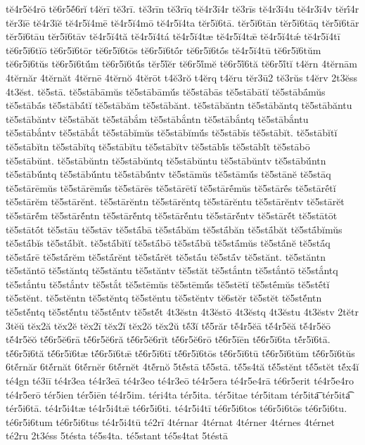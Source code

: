 {tĕ4r5ĕ4rō
tĕ6r5ĕ́6rĭ
t4ĕrī
tĕ3rī.
tĕ3rīn
tĕ3rīq
tĕ4r3ī4r
tĕ3rīs
tĕ4r3ī4u
tĕ4r3ī4v
tĕrī́4r
tĕr3ĭē
tĕ4r3ĭĕ
tĕ4r5ĭ4mē
tĕ4r5ĭ4mō
tĕ4r5ĭ4ta
tĕr5ĭ6tā.
tĕr5ĭ6tān
tĕr5ĭ6tāq
tĕr5ĭ6tār
tĕr5ĭ6tāu
tĕr5ĭ6tāv
tĕ4r5ĭ4tă
tĕ4r5ĭ4tá
tĕ4r5ĭ4tæ
tĕ4r5ĭ4tǣ
tĕ4r5ĭ4tǽ
tĕ4r5ĭ4tī
tĕ6r5ĭ6tĭō
tĕ6r5ĭ6tōr
tĕ6r5ĭ6tōs
tĕ6r5ĭ6tṓr
tĕ6r5ĭ6tṓs
tĕ4r5ĭ4tū
tĕ6r5ĭ6tŭm
tĕ6r5ĭ6tŭs
tĕ6r5ĭ6tŭ́m
tĕ6r5ĭ6tŭ́s
tĕr5ĭ́ĕr
tĕ6r5ĭ́mĕ
tĕ6r5ĭ́6tă
tĕ6r5ĭ́tĭ
t4ĕrn
4tĕrnām
4tĕrnăr
4tĕrnăt
4tĕrnē
4tĕrnŏ
4tĕrōt
t4ĕ3rŏ
t4ĕrq
t4ĕru
tĕr3ū2
tĕ3rŭs
t4ĕrv
2t3ĕss
4t3ĕst.
tĕ5stā.
tĕ5stābāmŭs
tĕ5stābāmŭ́s
tĕ5stābās
tĕ5stābātĭ
tĕ5stābā́mŭs
tĕ5stābā́s
tĕ5stābā́tĭ
tĕ5stābăm
tĕ5stābănt.
tĕ5stābăntn
tĕ5stābăntq
tĕ5stābăntu
tĕ5stābăntv
tĕ5stābăt
tĕ5stābắm
tĕ5stābắntn
tĕ5stābắntq
tĕ5stābắntu
tĕ5stābắntv
tĕ5stābắt
tĕ5stābĭmŭs
tĕ5stābĭmŭ́s
tĕ5stābĭs
tĕ5stābĭt.
tĕ5stābĭtĭ
tĕ5stābĭtn
tĕ5stābĭtq
tĕ5stābĭtu
tĕ5stābĭtv
tĕ5stābĭ́s
tĕ5stābĭ́t
tĕ5stābō
tĕ5stābŭnt.
tĕ5stābŭntn
tĕ5stābŭntq
tĕ5stābŭntu
tĕ5stābŭntv
tĕ5stābŭ́ntn
tĕ5stābŭ́ntq
tĕ5stābŭ́ntu
tĕ5stābŭ́ntv
tĕ5stāmŭs
tĕ5stāmŭ́s
tĕ5stānĕ
tĕ5stāq
tĕ5stārēmŭs
tĕ5stārēmŭ́s
tĕ5stārēs
tĕ5stārētĭ
tĕ5stārḗmŭs
tĕ5stārḗs
tĕ5stārḗtĭ
tĕ5stārĕm
tĕ5stārĕnt.
tĕ5stārĕntn
tĕ5stārĕntq
tĕ5stārĕntu
tĕ5stārĕntv
tĕ5stārĕt
tĕ5stārĕ́m
tĕ5stārĕ́ntn
tĕ5stārĕ́ntq
tĕ5stārĕ́ntu
tĕ5stārĕ́ntv
tĕ5stārĕ́t
tĕ5stātōt
tĕ5stātṓt
tĕ5stāu
tĕ5stāv
tĕ5stā́bā
tĕ5stā́băm
tĕ5stā́băn
tĕ5stā́băt
tĕ5stā́bĭmŭs
tĕ5stā́bĭs
tĕ5stā́bĭt.
tĕ5stā́bĭtĭ
tĕ5stā́bō
tĕ5stā́bŭ
tĕ5stā́mŭs
tĕ5stā́nĕ
tĕ5stā́q
tĕ5stā́rē
tĕ5stā́rĕm
tĕ5stā́rĕnt
tĕ5stā́rĕt
tĕ5stā́u
tĕ5stā́v
tĕ5stănt.
tĕ5stăntn
tĕ5stăntō
tĕ5stăntq
tĕ5stăntu
tĕ5stăntv
tĕ5stăt
tĕ5stắntn
tĕ5stắntō
tĕ5stắntq
tĕ5stắntu
tĕ5stắntv
tĕ5stắt
tĕ5stēmŭs
tĕ5stēmŭ́s
tĕ5stētĭ
tĕ5stḗmŭs
tĕ5stḗtĭ
tĕ5stĕnt.
tĕ5stĕntn
tĕ5stĕntq
tĕ5stĕntu
tĕ5stĕntv
tĕ6stĕr
tĕ5stĕt
tĕ5stĕ́ntn
tĕ5stĕ́ntq
tĕ5stĕ́ntu
tĕ5stĕ́ntv
tĕ5stĕ́t
4t3ĕstn
4t3ĕstō
4t3ĕstq
4t3ĕstu
4t3ĕstv
2tĕtr
3tĕŭ
tĕx2ă
tĕx2ĕ
tĕx2ī
tĕx2ĭ
tĕx2ŏ
tĕx2ŭ
tĕ́3ĭ
tĕ́5răr
tĕ́4r5ĕā
tĕ́4r5ĕă
tĕ́4r5ĕō
tĕ́4r5ĕŏ
tĕ́6r5ĕ6rā
tĕ́6r5ĕ6ră
tĕ́6r5ĕ6rĭt
tĕ́6r5ĕ6rō
tĕ́6r5ĭēn
tĕ́6r5ĭ6ta
tĕ́r5ĭ6tā.
tĕ́6r5ĭ6tă
tĕ́6r5ĭ6tæ
tĕ́6r5ĭ6tǣ
tĕ́6r5ĭ6tī
tĕ́6r5ĭ6tōs
tĕ́6r5ĭ6tū
tĕ́6r5ĭ6tŭm
tĕ́6r5ĭ6tŭs
6tĕ́rnăr
6tĕ́rnăt
6tĕ́rnĕr
6tĕ́rnĕt
4tĕ́rnŏ
5tĕ́stā
tĕ́5stā.
tĕ́5s4tă
tĕ́5stĕnt
tĕ́5stĕt
tĕ́x4ĭ
té4gn
té3iī
té4r3ea
té4r3eā
té4r3eo
té4r3eō
té4r5era
té4r5e4rā
té6r5erit
té4r5e4ro
té4r5erō
tér5ien
tér5iēn
té4r5im.
téri4ta
tér5ita.
tér5itae
tér5itam
tér5ita͞
tér5ita͡
tér5i6tā.
té4r5i4tæ
té4r5i4tǣ
té6r5i6ti.
té4r5i4tī
té6r5i6tos
té6r5i6tōs
té6r5i6tu.
té6r5i6tum
té6r5i6tus
té4r5i4tū
té2rī
4térnar
4térnat
4térner
4térnes
4térnet
té2ru
2t3éss
5tésta
té5s4ta.
té5stant
té5s4tat
5téstā
}
